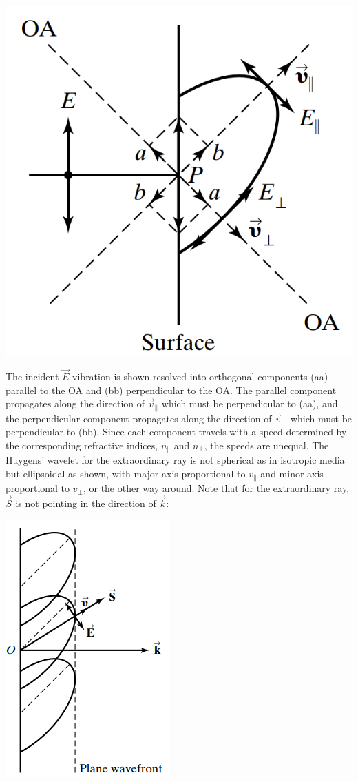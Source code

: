 \documentclass[11pt]{book}
\theoremstyle{break}
\theoremstyle{break}
\begin{document}
\begin{center}
\includegraphics[scale=0.39]{waveletsOA}
\end{center}
The incident $\vec{E}$ vibration is shown resolved into orthogonal components (aa) parallel to the OA and (bb) perpendicular
to the OA. The parallel component propagates along the direction of $\vec{v}_{\parallel}$ which must be perpendicular to (aa), and the perpendicular component propagates along the direction of $\vec{v}_{\perp}$ which must be perpendicular to (bb). Since each component travels with a speed determined by the corresponding refractive indices, $n_{\parallel}$ and $n_{\perp}$, the speeds are unequal. The Huygens' wavelet for the extraordinary ray is not spherical as in isotropic media but ellipsoidal as shown, with major axis
proportional to $v_{\parallel}$ and minor axis proportional to $v_{\perp}$, or the other way around. Note that for the extraordinary ray, $\vec{S}$ is not pointing in the direction of $\vec{k}$:
\begin{center}
\includegraphics[scale=0.85]{EllipWaveFront}
\end{center}
\end{document}
